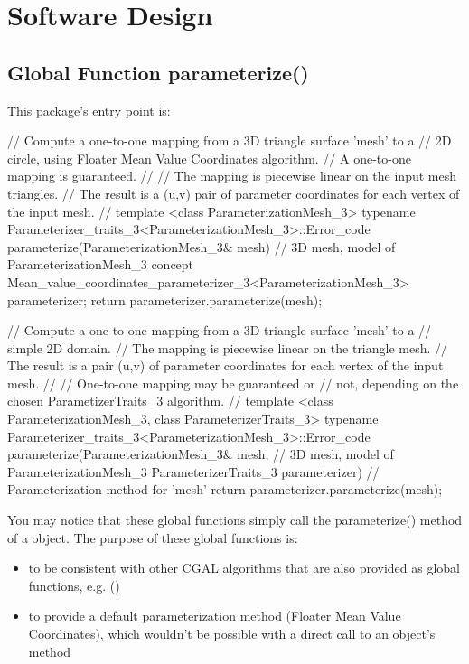 \section{Software Design}

\subsection{Global Function parameterize()}

This package's entry point is:

\begin{ccExampleCode}

// Compute a one-to-one mapping from a 3D triangle surface 'mesh' to a
// 2D circle, using Floater Mean Value Coordinates algorithm.
// A one-to-one mapping is guaranteed.
//
// The mapping is piecewise linear on the input mesh triangles.
// The result is a (u,v) pair of parameter coordinates for each vertex of the input mesh.
//
template <class ParameterizationMesh_3>
typename Parameterizer_traits_3<ParameterizationMesh_3>::Error_code
parameterize(ParameterizationMesh_3& mesh)  // 3D mesh, model of ParameterizationMesh_3 concept
{
    Mean_value_coordinates_parameterizer_3<ParameterizationMesh_3> parameterizer;
    return parameterizer.parameterize(mesh);
}


// Compute a one-to-one mapping from a 3D triangle surface 'mesh' to a
// simple 2D domain.
// The mapping is piecewise linear on the triangle mesh.
// The result is a pair (u,v) of parameter coordinates for each vertex of the input mesh.
//
// One-to-one mapping may be guaranteed or
// not, depending on the chosen ParametizerTraits_3 algorithm.
//
template <class ParameterizationMesh_3, class ParameterizerTraits_3>
typename Parameterizer_traits_3<ParameterizationMesh_3>::Error_code
parameterize(ParameterizationMesh_3& mesh,          // 3D mesh, model of ParameterizationMesh_3
             ParameterizerTraits_3 parameterizer)   // Parameterization method for 'mesh'
{
    return parameterizer.parameterize(mesh);
}

\end{ccExampleCode}

You may notice that these global functions simply call the
parameterize() method of a  object.
The purpose of these global functions is:
\begin{itemize}
\item to be consistent with other CGAL algorithms that are also provided as
      global functions, e.g. ()
\item to provide a default parameterization method (Floater Mean Value Coordinates),
      which wouldn't be possible with a direct call to an object's method
\end{itemize}

